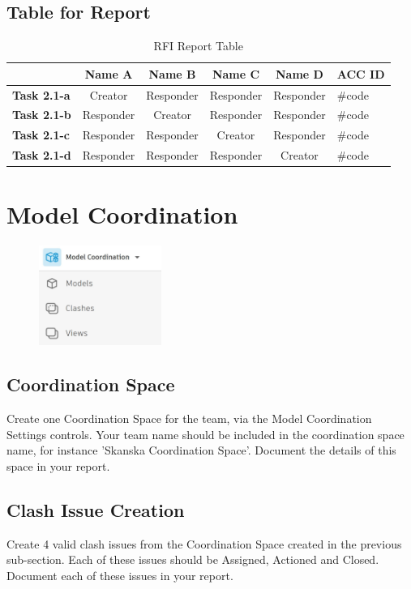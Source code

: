 \subsection{Table for Report}

\begin{table}[ht]
	\centering
	\begin{tabular}{|l|c|c|c|c|l|}
		\hline
		& \textbf{Name A} & \textbf{Name B} & \textbf{Name C} & \textbf{Name D} & \textbf{ACC ID}\\
		\hline
		\textbf{Task 2.1-a} & Creator & Responder & Responder & Responder & \#code\\
		\textbf{Task 2.1-b} & Responder & Creator & Responder & Responder & \#code\\
		\textbf{Task 2.1-c} & Responder & Responder & Creator & Responder & \#code\\
		\textbf{Task 2.1-d} & Responder & Responder & Responder & Creator & \#code\\
		\hline
	\end{tabular}
	\caption{RFI Report Table }
	\label{tab:rfi-items}
\end{table}





\newpage

\section{Model Coordination}
\begin{figure}[h!t]
	\includegraphics[width=4.0cm]{RevitAssets/modelcoord}
	\label{fig:modelmgmt}
\end{figure}


\subsection{Coordination Space}
Create one Coordination Space for the team, via the Model Coordination Settings controls.  Your team name should be included in the coordination space name, for instance 'Skanska Coordination Space'.  Document the details of this space in your report.
\subsection{Clash Issue Creation}
Create 4 valid clash issues from the Coordination Space created in the previous sub-section.  Each of these issues should be Assigned, Actioned and Closed.  Document each of these issues in your report.

